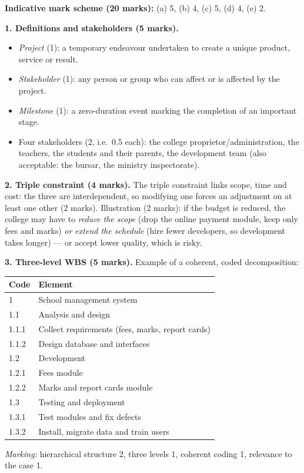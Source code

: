 \documentclass[11pt]{article}
\newcommand{\cle}[1]{{\popxbold\color{popdark}#1}}
\begin{document}
\begin{corrige}
\textbf{Indicative mark scheme (20 marks):} (a) 5, (b) 4, (c) 5, (d) 4, (e) 2.

\textbf{1. Definitions and stakeholders (5 marks).}
\begin{itemize}
\item \emph{Project} (1): a temporary endeavour undertaken to create a unique product, service or result.
\item \emph{Stakeholder} (1): any person or group who can affect or is affected by the project.
\item \emph{Milestone} (1): a zero-duration event marking the completion of an important stage.
\item Four stakeholders (2, i.e.\ 0.5 each): the college proprietor/administration, the teachers, the students and their parents, the development team (also acceptable: the bursar, the ministry inspectorate).
\end{itemize}

\textbf{2. Triple constraint (4 marks).} The triple constraint links \cle{scope}, \cle{time} and \cle{cost}: the three are interdependent, so modifying one forces an adjustment on at least one other (2 marks). Illustration (2 marks): if the budget is reduced, the college may have to \emph{reduce the scope} (drop the online payment module, keep only fees and marks) \emph{or extend the schedule} (hire fewer developers, so development takes longer) --- or accept lower quality, which is risky.

\textbf{3. Three-level WBS (5 marks).} Example of a coherent, coded decomposition:
\begin{center}
\begin{tabularx}{\linewidth}{|l|X|}\hline
\rowcolor{popblueL} \textbf{Code} & \textbf{Element} \\ \hline
1 & School management system \\ \hline
1.1 & Analysis and design \\ \hline
1.1.1 & Collect requirements (fees, marks, report cards) \\ \hline
1.1.2 & Design database and interfaces \\ \hline
1.2 & Development \\ \hline
1.2.1 & Fees module \\ \hline
1.2.2 & Marks and report cards module \\ \hline
1.3 & Testing and deployment \\ \hline
1.3.1 & Test modules and fix defects \\ \hline
1.3.2 & Install, migrate data and train users \\ \hline
\end{tabularx}
\end{center}
\emph{Marking:} hierarchical structure 2, three levels 1, coherent coding 1, relevance to the case 1.


\end{corrige}
\end{document}
